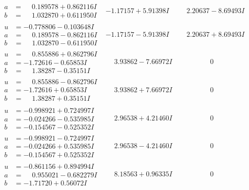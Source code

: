 \documentclass[1p]{elsarticle_modified}
\theoremstyle{definition}
\begin{document}
$$\begin{array}{c|c|c}
\begin{aligned}
a &= \phantom{-}0.189578 + 0.862116 I \\
b &= \phantom{-}1.032870 + 0.611950 I\end{aligned}
 & -1.17157 + 5.91398 I & \phantom{-}2.20637 - 8.69493 I \\ \hline\begin{aligned}
u &= -0.778806 - 0.103648 I \\
a &= \phantom{-}0.189578 - 0.862116 I \\
b &= \phantom{-}1.032870 - 0.611950 I\end{aligned}
 & -1.17157 - 5.91398 I & \phantom{-}2.20637 + 8.69493 I \\ \hline\begin{aligned}
u &= \phantom{-}0.855886 + 0.862796 I \\
a &= -1.72616 - 0.65853 I \\
b &= \phantom{-}1.38287 - 0.35151 I\end{aligned}
 & \phantom{-}3.93862 - 7.66972 I & \phantom{-0.000000 } 0 \\ \hline\begin{aligned}
u &= \phantom{-}0.855886 - 0.862796 I \\
a &= -1.72616 + 0.65853 I \\
b &= \phantom{-}1.38287 + 0.35151 I\end{aligned}
 & \phantom{-}3.93862 + 7.66972 I & \phantom{-0.000000 } 0 \\ \hline\begin{aligned}
u &= -0.998921 + 0.724997 I \\
a &= -0.024266 - 0.535985 I \\
b &= -0.154567 - 0.525352 I\end{aligned}
 & \phantom{-}2.96538 + 4.21460 I & \phantom{-0.000000 } 0 \\ \hline\begin{aligned}
u &= -0.998921 - 0.724997 I \\
a &= -0.024266 + 0.535985 I \\
b &= -0.154567 + 0.525352 I\end{aligned}
 & \phantom{-}2.96538 - 4.21460 I & \phantom{-0.000000 } 0 \\ \hline\begin{aligned}
u &= -0.861156 + 0.894994 I \\
a &= \phantom{-}0.955021 - 0.682279 I \\
b &= -1.71720 + 0.56072 I\end{aligned}
 & \phantom{-}8.18563 + 0.96335 I & \phantom{-0.000000 } 0 \\ \hline\begin{aligned}

\end{aligned}
\end{array}$$
\end{document}
